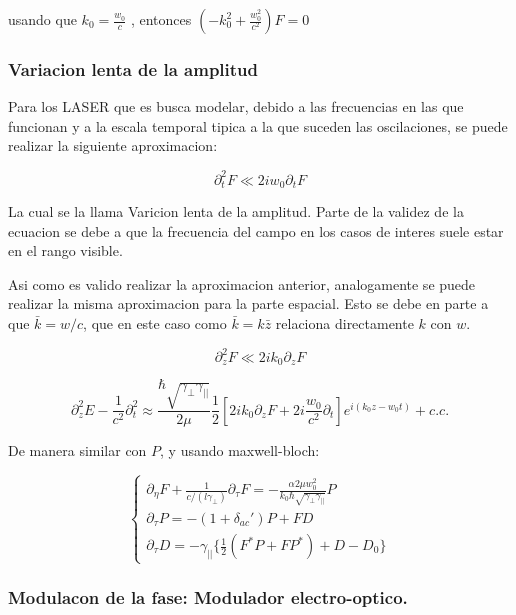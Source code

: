 				usando que $k_0=\frac{w_0}{c}$ , entonces $(-k_0^2+\frac{w_0^2}{c^2})F=0$
				
				\subsubsection{Variacion lenta de la amplitud}
				
				Para los LASER que es busca modelar, debido a las frecuencias en las que funcionan y a la escala temporal tipica a la que suceden las oscilaciones, se puede realizar la siguiente aproximacion:
				
				\[ \partial^2_t F\ll 2iw_0 \partial_t F
				    \]  
				
				La cual se la llama Varicion lenta de la amplitud. Parte de la validez de la ecuacion se debe a que la frecuencia del campo en los casos de interes suele estar en el rango visible.
				
				Asi como es valido realizar la aproximacion anterior, analogamente se puede realizar la misma aproximacion para la parte espacial. 
				Esto se debe en parte  a que $\bar{k}=w/c$, que en este caso como $\bar{k}=k\bar{z}$ relaciona directamente $k$ con $w$.
				
				
				 \[\partial^2_z F \ll 2ik_0\partial_z F 
				 \] 
				
				
				\[ \partial^2_{z} E - \frac{1}{c^2}\partial^2_{t}\approx  \frac{\hbar \sqrt{ \gamma_{\bot} \gamma_{||} }}{2\mu }\frac{1}{2} {[2ik_0 \partial_z F +2i\frac{w_0}{c^2}\partial_t]e^{i(k_0 z -w_0 t)}+c.c.} 
				\]
				
				De manera similar con $P$, y usando maxwell-bloch:
				
				\begin{equation}
				\begin{cases}
				\partial_{\eta}F+\frac{1}{c/(l\gamma_{\bot})}\partial_{\tau}F= -\frac{\alpha 2 \mu w_0^2}{k_0 \hbar \sqrt{ \gamma_{\bot} \gamma_{||} }} P\\
				\partial_{\tau} P=-{(1+\delta_{ac}')P+FD}\\
				\partial_{\tau}D=-\gamma_{||}\{\frac{1}{2}(F^*P+FP^*)+D-D_0\}
				\end{cases}
				\label{eq: eqs 1}
				\end{equation}  %
				
	\subsubsection{Modulacon de la fase: Modulador electro-optico.}
				
